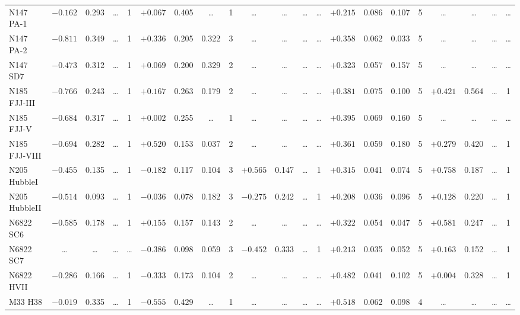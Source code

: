 \documentclass{aa}
\begin{document}
\begin{appendix}
\begin{table*}
\begin{adjustbox}{width=1\textwidth}
{\begin{tabular}{l cccccccccccccccccccc}
N147 PA-1     & $-0.162$ & 0.293 & \ldots & 1 & $+0.067$ & 0.405 & \ldots & 1 & \ldots & \ldots & \ldots & \ldots & $+0.215$ & 0.086 & 0.107 & 5 & \ldots & \ldots & \ldots & \ldots \\
N147 PA-2     & $-0.811$ & 0.349 & \ldots & 1 & $+0.336$ & 0.205 & 0.322 & 3 & \ldots & \ldots & \ldots & \ldots & $+0.358$ & 0.062 & 0.033 & 5 & \ldots & \ldots & \ldots & \ldots \\
N147 SD7      & $-0.473$ & 0.312 & \ldots & 1 & $+0.069$ & 0.200 & 0.329 & 2 & \ldots & \ldots & \ldots & \ldots & $+0.323$ & 0.057 & 0.157 & 5 & \ldots & \ldots & \ldots & \ldots \\
N185 FJJ-III  & $-0.766$ & 0.243 & \ldots & 1 & $+0.167$ & 0.263 & 0.179 & 2 & \ldots & \ldots & \ldots & \ldots & $+0.381$ & 0.075 & 0.100 & 5 & $+0.421$ & 0.564 & \ldots & 1 \\
N185 FJJ-V    & $-0.684$ & 0.317 & \ldots & 1 & $+0.002$ & 0.255 & \ldots & 1 & \ldots & \ldots & \ldots & \ldots & $+0.395$ & 0.069 & 0.160 & 5 & \ldots & \ldots & \ldots & \ldots \\
N185 FJJ-VIII & $-0.694$ & 0.282 & \ldots & 1 & $+0.520$ & 0.153 & 0.037 & 2 & \ldots & \ldots & \ldots & \ldots & $+0.361$ & 0.059 & 0.180 & 5 & $+0.279$ & 0.420 & \ldots & 1 \\
N205 HubbleI  & $-0.455$ & 0.135 & \ldots & 1 & $-0.182$ & 0.117 & 0.104 & 3 & $+0.565$ & 0.147 & \ldots & 1 & $+0.315$ & 0.041 & 0.074 & 5 & $+0.758$ & 0.187 & \ldots & 1 \\
N205 HubbleII & $-0.514$ & 0.093 & \ldots & 1 & $-0.036$ & 0.078 & 0.182 & 3 & $-0.275$ & 0.242 & \ldots & 1 & $+0.208$ & 0.036 & 0.096 & 5 & $+0.128$ & 0.220 & \ldots & 1 \\
N6822 SC6     & $-0.585$ & 0.178 & \ldots & 1 & $+0.155$ & 0.157 & 0.143 & 2 & \ldots & \ldots & \ldots & \ldots & $+0.322$ & 0.054 & 0.047 & 5 & $+0.581$ & 0.247 & \ldots & 1 \\
N6822 SC7     & \ldots & \ldots & \ldots & \ldots & $-0.386$ & 0.098 & 0.059 & 3 & $-0.452$ & 0.333 & \ldots & 1 & $+0.213$ & 0.035 & 0.052 & 5 & $+0.163$ & 0.152 & \ldots & 1 \\
N6822 HVII    & $-0.286$ & 0.166 & \ldots & 1 & $-0.333$ & 0.173 & 0.104 & 2 & \ldots & \ldots & \ldots & \ldots & $+0.482$ & 0.041 & 0.102 & 5 & $+0.004$ & 0.328 & \ldots & 1 \\
M33 H38       & $-0.019$ & 0.335 & \ldots & 1 & $-0.555$ & 0.429 & \ldots & 1 & \ldots & \ldots & \ldots & \ldots & $+0.518$ & 0.062 & 0.098 & 4 & \ldots & \ldots & \ldots & \ldots \\

\end{tabular}}
\end{adjustbox}
\end{table*}
\end{appendix}
\end{document}
